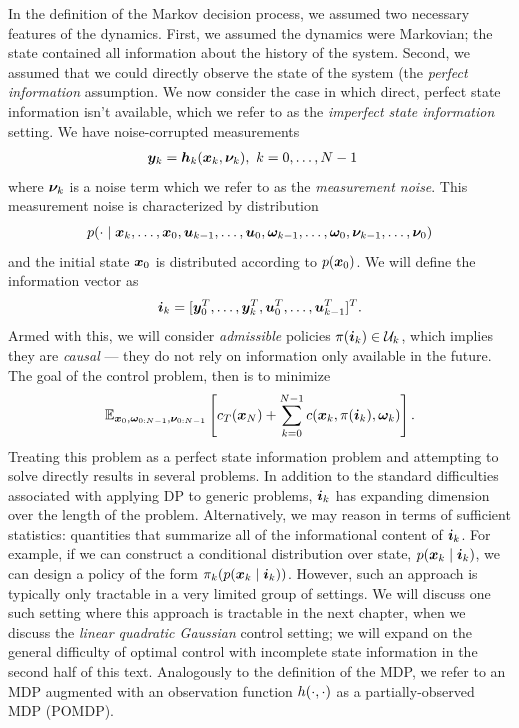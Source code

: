 In the definition of the Markov decision process, we assumed two necessary features of the dynamics. First, we assumed the dynamics were Markovian; the state contained all information about the history of the system. Second, we assumed that we could directly observe the state of the system (the \textit{perfect information} assumption. 
We now consider the case in which direct, perfect state information isn't available, which we refer to as the \textit{imperfect state information} setting. We have noise-corrupted measurements
\begin{align}
    \bm{y}_{k} &= \bm{h}_k(\bm{x}_k, \bm{\nu}_{k}), \,\, k=0,\ldots,N-1
\end{align}
where $\bm{\nu}_k$ is a noise term which we refer to as the \textit{measurement noise}. This measurement noise is characterized by distribution 
\begin{equation}
    p(\cdot\mid \bm{x}_k,\ldots,\bm{x}_0,\bm{u}_{k-1},\ldots,\bm{u}_0,\bm{\omega}_{k-1},\ldots,\bm{\omega}_{0},\bm{\nu}_{k-1},\ldots,\bm{\nu}_{0})
\end{equation}
and the initial state $\bm{x}_0$ is distributed according to $p(\bm{x}_0)$. We will define the information vector as
\begin{equation}
    \bm{i}_k = [\bm{y}_0^T, \ldots, \bm{y}_k^T, \bm{u}_0^T, \ldots, \bm{u}_{k-1}^T]^T.
\end{equation}
Armed with this, we will consider \textit{admissible} policies $\pi(\bm{i}_k) \in \mathcal{U}_k$, which implies they are \textit{causal} --- they do not rely on information only available in the future. The goal of the control problem, then is to minimize 
\begin{equation}
    \mathbb{E}_{\bm{x}_{0},\bm{\omega}_{0:N-1},\bm{\nu}_{0:N-1}} \left[ c_T(\bm{x}_N) + \sum_{k=0}^{N-1} c(\bm{x}_k, \pi(\bm{i}_k),\bm{\omega}_{k}) \right].
\end{equation}
Treating this problem as a perfect state information problem and attempting to solve directly results in several problems. In addition to the standard difficulties associated with applying DP to generic problems, $\bm{i}_k$ has expanding dimension over the length of the problem. Alternatively, we may reason in terms of sufficient statistics: quantities that summarize all of the informational content of $\bm{i}_k$. For example, if we can construct a conditional distribution over state, $p(\bm{x}_k\mid\bm{i}_k)$, we can design a policy of the form $\pi_k(p(\bm{x}_k\mid\bm{i}_k))$. However, such an approach is typically only tractable in a very limited group of settings. We will discuss one such setting where this approach is tractable in the next chapter, when we discuss the \textit{linear quadratic Gaussian} control setting; we will expand on the general difficulty of optimal control with incomplete state information in the second half of this text. Analogously to the definition of the MDP, we refer to an MDP augmented with an observation function $h(\cdot,\cdot)$ as a partially-observed MDP (POMDP). 

